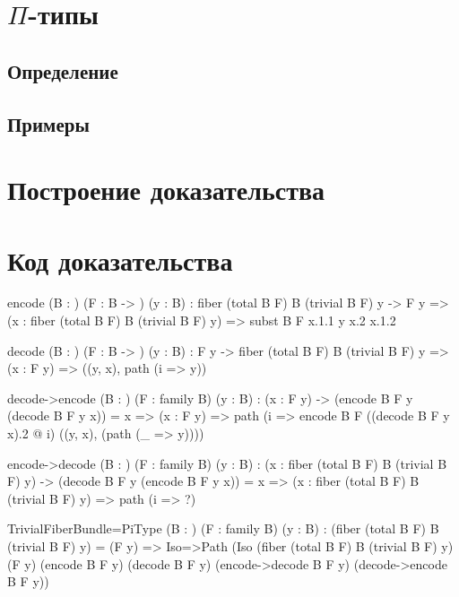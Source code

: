 \section{$\Pi$-типы}

\subsection{Определение}

\subsection{Примеры}

\section{Построение доказательства}

\Conc

\printbibliography[%
    heading=bibintoc%
    ,title=Библиография
]

\appendix
{}

\section{Код доказательства}

\begin{ListingEnv}[H]
\begin{Verb}
\func encode (B : \Type) (F : B -> \Type) (y : B) :
      fiber (total B F) B (trivial B F) y -> F y
   => \lam (x : fiber (total B F) B (trivial B F) y)
   => subst B F x.1.1 y x.2 x.1.2

\func decode (B : \Type) (F : B -> \Type) (y : B) :
      F y -> fiber (total B F) B (trivial B F) y
   => \lam (x : F y) => ((y, x), path (\lam i => y))

\func decode->encode (B : \Type) (F : family B) (y : B) :
  \Pi (x : F y) -> (encode B F y (decode B F y x)) = x
  => \lam (x : F y)
  => path 
  (\lam i 
  => encode B F ((decode B F y x).2 @ i) ((y, x), (path (\lam _ => y))))

\func encode->decode (B : \Type) (F : family B) (y : B) :
  \Pi (x : fiber (total B F) B (trivial B F) y) 
  -> (decode B F y (encode B F y x)) = x
  => \lam (x : fiber (total B F) B (trivial B F) y) 
  => path (\lam i => {?})

\func TrivialFiberBundle=PiType (B : \Type) 
	(F : family B) 
	(y : B) : 
	(fiber (total B F) B (trivial B F) y) = (F y)
  	=> Iso=>Path 
  	(\new Iso 
  	(fiber (total B F) B (trivial B F) y)
  	(F y)
  	(encode B F y) 
  	(decode B F y) 
  	(encode->decode B F y) 
  	(decode->encode B F y))
\end{Verb}
\end{ListingEnv}



